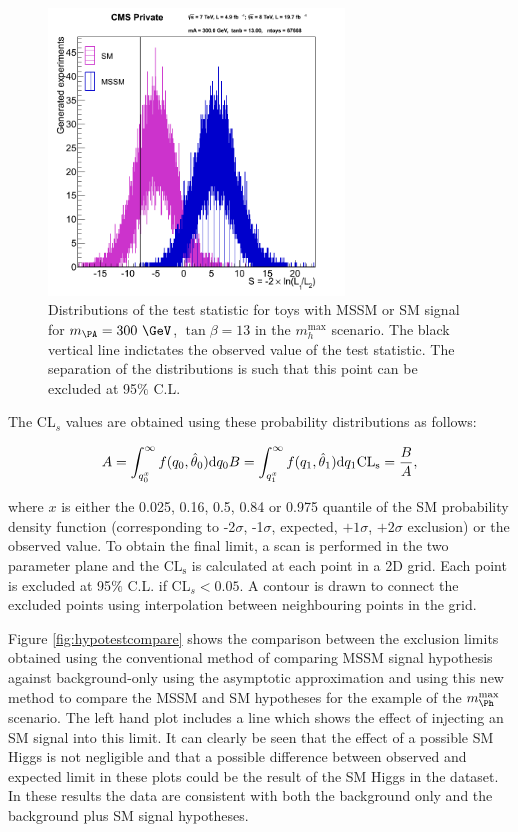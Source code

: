 \begin{figure}[tbh]
\includegraphics[width=0.7\textwidth]{plots/htt-mssm/sigsep_13.png}
\caption{Distributions of the test statistic for toys with MSSM or SM
signal for $m_{\PA} = 300~\GeV$, $\tan\beta = 13$ in the $m_{h}^{\text{max}}$
scenario. The black vertical line indictates the observed value of the test
statistic. The separation of the distributions is such that this point can be
excluded at 95$\%$ C.L.}
\label{fig:toydistribution}
\end{figure}

The CL$_{s}$ values are obtained using these probability distributions as
follows:

\begin{equation}
A = \int_{q_{0}^{x}}^{\infty}f(q_{0},\hat{\theta}_{0})\mathrm{d}q_{0}\, \\
B = \int_{q_{1}^{x}}^{\infty}f(q_{1},\hat{\theta}_{1})\mathrm{d}q_{1}\, \\
\mathrm{CL_{s}} = \frac{B}{A},
\end{equation}

where $x$ is either the 0.025, 0.16, 0.5, 0.84 or 0.975 quantile of the SM
probability density function (corresponding to -2$\sigma$, -1$\sigma$, expected,
$+1\sigma$, $+2\sigma$ exclusion) or the observed value. To obtain the final limit, 
a scan is performed in the two parameter plane and
the $\mathrm{CL_{s}}$ is calculated at each point in a 2D grid. Each point is excluded at
95$\%$ C.L. if CL$_{s}<0.05$. A contour is drawn to connect the excluded points
using interpolation between neighbouring points in the grid.

Figure \ref{fig:hypotestcompare} shows the comparison between the exclusion
limits obtained using the conventional method of comparing \ac{MSSM} signal
hypothesis against background-only using the asymptotic approximation 
and using this new method to compare the
\ac{MSSM} and \ac{SM} hypotheses for the example of the $m_{\Ph}^\text{max}$
scenario. The left hand plot includes a line which shows
the effect of injecting an \ac{SM} signal into this limit. It can clearly be
seen that the effect of a possible \ac{SM} Higgs is not negligible and that a
possible difference between observed and expected limit in these plots could be 
the result of the \ac{SM} Higgs in the dataset. In these results the data are 
consistent with both the background only and the background plus \ac{SM} signal hypotheses.


